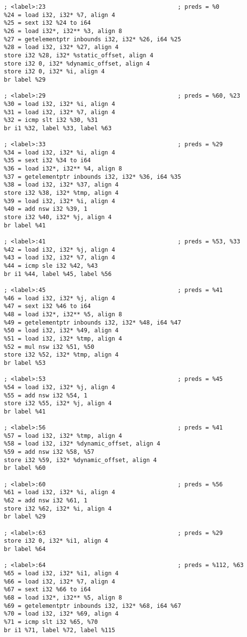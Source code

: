 \begin{verbatim}
; <label>:23                                      ; preds = %0
%24 = load i32, i32* %7, align 4
%25 = sext i32 %24 to i64
%26 = load i32*, i32** %3, align 8
%27 = getelementptr inbounds i32, i32* %26, i64 %25
%28 = load i32, i32* %27, align 4
store i32 %28, i32* %static_offset, align 4
store i32 0, i32* %dynamic_offset, align 4
store i32 0, i32* %i, align 4
br label %29

; <label>:29                                      ; preds = %60, %23
%30 = load i32, i32* %i, align 4
%31 = load i32, i32* %7, align 4
%32 = icmp slt i32 %30, %31
br i1 %32, label %33, label %63

; <label>:33                                      ; preds = %29
%34 = load i32, i32* %i, align 4
%35 = sext i32 %34 to i64
%36 = load i32*, i32** %4, align 8
%37 = getelementptr inbounds i32, i32* %36, i64 %35
%38 = load i32, i32* %37, align 4
store i32 %38, i32* %tmp, align 4
%39 = load i32, i32* %i, align 4
%40 = add nsw i32 %39, 1
store i32 %40, i32* %j, align 4
br label %41

; <label>:41                                      ; preds = %53, %33
%42 = load i32, i32* %j, align 4
%43 = load i32, i32* %7, align 4
%44 = icmp sle i32 %42, %43
br i1 %44, label %45, label %56

; <label>:45                                      ; preds = %41
%46 = load i32, i32* %j, align 4
%47 = sext i32 %46 to i64
%48 = load i32*, i32** %5, align 8
%49 = getelementptr inbounds i32, i32* %48, i64 %47
%50 = load i32, i32* %49, align 4
%51 = load i32, i32* %tmp, align 4
%52 = mul nsw i32 %51, %50
store i32 %52, i32* %tmp, align 4
br label %53

; <label>:53                                      ; preds = %45
%54 = load i32, i32* %j, align 4
%55 = add nsw i32 %54, 1
store i32 %55, i32* %j, align 4
br label %41

; <label>:56                                      ; preds = %41
%57 = load i32, i32* %tmp, align 4
%58 = load i32, i32* %dynamic_offset, align 4
%59 = add nsw i32 %58, %57
store i32 %59, i32* %dynamic_offset, align 4
br label %60

; <label>:60                                      ; preds = %56
%61 = load i32, i32* %i, align 4
%62 = add nsw i32 %61, 1
store i32 %62, i32* %i, align 4
br label %29

; <label>:63                                      ; preds = %29
store i32 0, i32* %i1, align 4
br label %64

; <label>:64                                      ; preds = %112, %63
%65 = load i32, i32* %i1, align 4
%66 = load i32, i32* %7, align 4
%67 = sext i32 %66 to i64
%68 = load i32*, i32** %5, align 8
%69 = getelementptr inbounds i32, i32* %68, i64 %67
%70 = load i32, i32* %69, align 4
%71 = icmp slt i32 %65, %70
br i1 %71, label %72, label %115


\end{verbatim}

